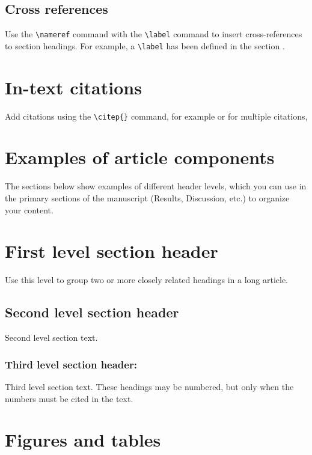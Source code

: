 \documentclass[9pt,twocolumn,twoside,lineno]{gsajnl}
\begin{document}
\subsection{Cross references}
Use the \verb|\nameref| command with the \verb|\label| command to insert cross-references to section headings. For example, a \verb|\label| has been defined in the section .

\section{In-text citations}

Add citations using the \verb|\citep{}| command, for example \citep{neher2013genealogies} or for multiple citations, \citep{neher2013genealogies, rodelsperger2014characterization,Falush16}

\section{Examples of article components}
\label{sec:examples}

The sections below show examples of different header levels, which you can use in the primary sections of the manuscript (Results, Discussion, etc.) to organize your content.

\section{First level section header}

Use this level to group two or more closely related headings in a long article.

\subsection{Second level section header}

Second level section text.

\subsubsection{Third level section header:}

Third level section text. These headings may be numbered, but only when the numbers must be cited in the text.

\section{Figures and tables}
\end{document}
